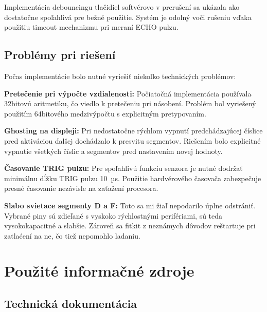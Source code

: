 \documentclass[11pt, a4paper,slovak]{article}
\begin{document}
Implementácia debouncingu tlačidiel softvérovo v prerušení sa ukázala ako dostatočne spoľahlivá pre bežné použitie. Systém je odolný voči rušeniu vďaka použitiu timeout mechanizmu pri meraní ECHO pulzu.

\subsection{Problémy pri riešení}

Počas implementácie bolo nutné vyriešiť niekoľko technických problémov:

\textbf{Pretečenie pri výpočte vzdialenosti:} Počiatočná implementácia používala 32bitovú aritmetiku, čo viedlo k pretečeniu pri násobení. Problém bol vyriešený použitím 64bitového medzivýpočtu s explicitným pretypovaním.

\textbf{Ghosting na displeji:} Pri nedostatočne rýchlom vypnutí predchádzajúcej číslice pred aktiváciou ďalšej dochádzalo k presvitu segmentov. Riešením bolo explicitné vypnutie všetkých číslic a segmentov pred nastavením novej hodnoty.

\textbf{Časovanie TRIG pulzu:} Pre spoľahlivú funkciu senzora je nutné dodržať minimálnu dĺžku TRIG pulzu 10~µs. Použitie hardvérového časovača zabezpečuje presné časovanie nezávisle na zaťažení procesora.

\textbf{Slabo svietace segmenty D a F:} Toto sa mi žiaľ nepodarilo úplne odstrániť. Vybrané piny sú zdieľané s vyskoko rýchlostnými perifériami, sú teda vysokokapacitné a slabšie. Zároveň sa fitkit z neznámych dôvodov reštartuje pri zatlaćení na ne, čo tiež nepomohlo ladaniu.

\newpage
\section{Použité informačné zdroje}

\subsection{Technická dokumentácia}
\end{document}
